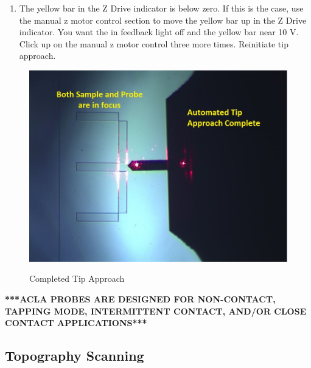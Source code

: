 \documentclass{../lab}
\begin{document}
\begin{enumerate}
\begin{itemize}
\begin{enumerate}
            \item The yellow bar in the Z Drive indicator is below zero. If this is the case, use the manual z motor control section to move the yellow bar up in the Z Drive indicator. You want the in feedback light off and the yellow bar near 10 V. Click up on the manual z motor control three more times. Reinitiate tip approach.
        \end{enumerate}
    \end{itemize}
    
\end{enumerate}

\begin{figure}[H]
    \centering
    \href{http://experimentationlab.berkeley.edu/sites/default/files/AFMImages/bothfocused.jpg}{\includegraphics[width=0.5\linewidth]{images/bothfocused.jpg}}
    \caption{Completed Tip Approach}
\end{figure}

\textbf{***ACLA PROBES ARE DESIGNED FOR NON-CONTACT, TAPPING MODE, INTERMITTENT CONTACT, AND/OR CLOSE CONTACT APPLICATIONS***}

\subsection{Topography Scanning}
\end{document}
